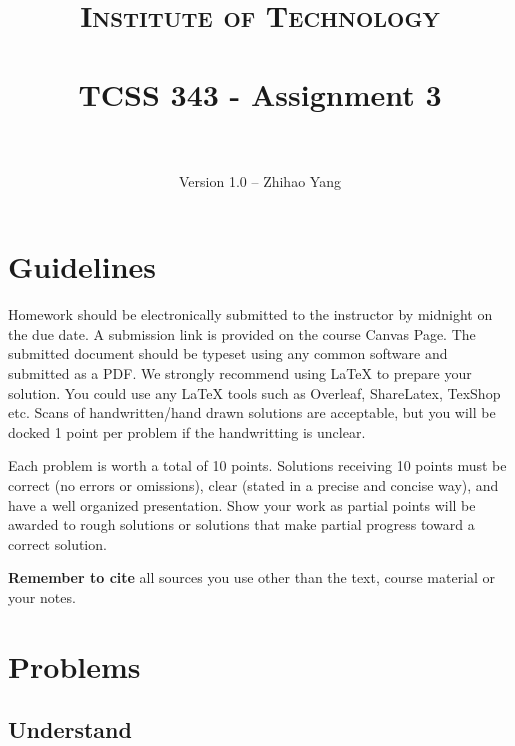 \documentclass[paper=a4, fontsize=11pt]{scrartcl}
\title{
		\usefont{OT1}{bch}{b}{n}
		\normalfont \normalsize \textsc{Institute of Technology} \\ [25pt]
		\horrule{0.5pt} \\[0.4cm]
		\huge TCSS 343 - Assignment 3\\
		\horrule{2pt} \\[0.5cm]
}
\author{
		\normalfont 								\normalsize
        Version 1.0 -- Zhihao Yang\\[-3pt]
}
\numberwithin{equation}{section}		%
\numberwithin{figure}{section}			%
\numberwithin{table}{section}				%
\begin{document}
\maketitle

\section{Guidelines}
Homework should be electronically submitted to the instructor by midnight on the due date.  A submission link is provided on the course Canvas Page.  The submitted document should be typeset using any common software and submitted as a PDF.  We strongly recommend using \LaTeX\;  to prepare your solution.  You could use any \LaTeX\; tools such as Overleaf, ShareLatex, TexShop etc. Scans of handwritten/hand drawn solutions are acceptable, but you will be docked 1 point per problem if the handwritting is unclear.

Each problem is worth a total of 10 points.  Solutions receiving 10 points must be correct (no errors or omissions), clear (stated in a precise and concise way), and have a well organized presentation.  Show your work as partial points will be awarded to rough solutions or solutions that make partial progress toward a correct solution.

\textbf{Remember to cite} all sources you use other than the text, course material or your notes.

\newpage
\section{Problems}

\subsection{Understand}
\end{document}
